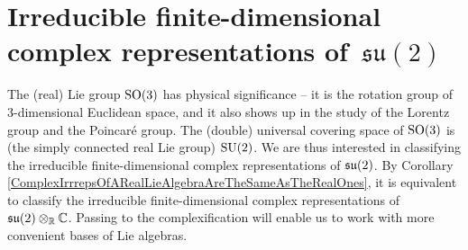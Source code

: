

\section{Irreducible finite-dimensional complex representations of \,$\mathfrak{su}(2)$}
\setcounter{theorem}{0}
\setcounter{equation}{0}


\renewcommand{\theenumi}{\roman{enumi}}
\renewcommand{\labelenumi}{\textnormal{(\theenumi)}$\;\;$}


\vskip 0.3cm
\begin{remark}
\mbox{}
\vskip 0.1cm
\noindent
The (real) Lie group $\textnormal{SO}(3)$ has physical significance --
it is the rotation group of $3$-dimensional Euclidean space, and
it also shows up in the study of the Lorentz group and the Poincaré group.
The (double) universal covering space of $\textnormal{SO}(3)$ is (the simply connected real Lie group) $\textnormal{SU}(2)$.
We are thus interested in classifying the irreducible finite-dimensional complex representations of $\mathfrak{su}(2)$.
By Corollary \ref{ComplexIrrrepsOfARealLieAlgebraAreTheSameAsTheRealOnes},
it is equivalent to classify the irreducible finite-dimensional complex representations of $\mathfrak{su}(2) \otimes_{\mathbb{R}} \mathbb{C}$.
Passing to the complexification will enable us to work with more convenient bases of Lie algebras.
\end{remark}


